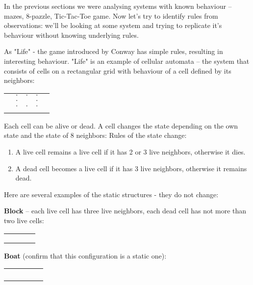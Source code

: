 In the previous sections we were analysing systems with known
behaviour -- mazes, 8-pazzle, Tic-Tac-Toe game. Now let's try to identify
rules from observations: we'll be looking at some system and trying
to replicate it's behaviour without knowing underlying rules.

As
"Life" - the game introduced by Conway
has simple rules, resulting in interesting behaviour. "Life"
is an example of cellular automata -- the system that consists
of cells on a rectangular grid with behaviour of a cell defined
by its neighbors:

\bigskip
\begin{center}
\begin{tabular}{c|c|c|c|c}
 & & & & \\
\hline
 & $\cdot$ & $\cdot$ & $\cdot$ & \\
\hline
 & $\cdot$ & \cellcolor{black} & $\cdot$  & \\
\hline
 & $\cdot$ & $\cdot$ & $\cdot$ & \\
\hline
 & & & & 
\end{tabular}
\end{center}
\bigskip

Each cell can be alive or dead. A cell changes the
state depending on the own state and the state of 8 neighbors:
Rules of the state change:

\begin{enumerate}
\item A live cell remains a live cell if it has 2 or 3 live neighbors, otherwise
it dies.
\item A dead cell becomes a live cell if it has 3 live neighbors,
otherwise it remains dead.
\end{enumerate}

Here are several examples of the static structures - they do not
change:

\textbf{Block} -- each live cell has three live neighbors, each dead cell
has not more than two live cells:
\begin{center}
\begin{tabular}{c|c|c|c}
 & & & \\
\hline
 & \cellcolor{black} & \cellcolor{black} & \\
\hline
 & \cellcolor{black} & \cellcolor{black} & \\
\hline
 & & &  
\end{tabular}
\end{center}
\bigskip

\textbf{Boat} (confirm that this configuration is a static one):
\begin{center}
\begin{tabular}{c|c|c|c|c}
 & & & & \\
\hline
 & \cellcolor{black} & \cellcolor{black} & & \\
\hline
 & \cellcolor{black} & & \cellcolor{black} & \\
\hline
 & & \cellcolor{black} & & \\
\hline
 & & & & 
\end{tabular}
\end{center}
\bigskip

